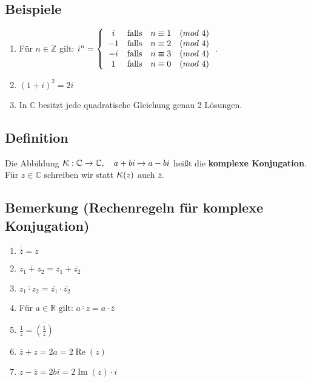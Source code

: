 	
\subsection{Beispiele}

	\begin{enumerate}
	\item Für $n\in\mathbb{Z}$ gilt: 
	$i^n=\left\{\begin{array}{ccc}
          		i	& \textnormal{falls}	& n\equiv 1 \quad (mod~4) \\
          		-1	& \textnormal{falls}	& n\equiv 2 \quad (mod~4) \\
          		-i	& \textnormal{falls}	& n\equiv 3 \quad (mod~4) \\
          		1	& \textnormal{falls}	& n\equiv 0 \quad (mod~4) \\                  			
          \end{array}\right.$.
	
	
	\item $(1+i)^2=2i$
	\item In $\mathbb{C}$ besitzt jede quadratische Gleichung genau 2 Lösungen.
	\end{enumerate}
	
	
\subsection[Komplexe Konjugation]{Definition}

	Die Abbildung $\mathlll{\kappa}:\mathbb{C}\rightarrow\mathbb{C},\quad a+bi\mapsto a-bi$ 
	heißt die \textbf{komplexe Konjugation}.\\ 
	Für $z\in\mathbb{C}$ schreiben wir statt $\mathlll{\kappa}(z)$ auch $\overline{z}$.
	
	
\subsection[Rechenregeln für komplexe Konjugation]{Bemerkung (Rechenregeln für komplexe Konjugation)}

	\begin{enumerate}
	\item $\overline{\overline{z}}=z$
	\item $\overline{z_1+z_2}=\overline{z_1}+\overline{z_2}$
	\item $\overline{z_1\cdot z_2}=\overline{z_1}\cdot\overline{z_2}$
	\item Für $a\in\mathbb{R}$ gilt: $\overline{a\cdot z}= a\cdot \overline{z}$
	\item $\frac{1}{\overline{z}}=\overline{\left(\frac{1}{z}\right)}$
	\item $\overline{z}+z=2a=2\operatorname{Re}(z)$
	\item $z-\overline{z}=2bi=2\operatorname{Im}(z)\cdot i$
	\end{enumerate}
	
